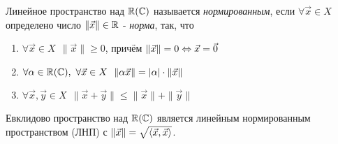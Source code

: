 \begin{definition}
	Линейное пространство над $\mathbb{R}(\mathbb{C})$ называется \textit{нормированным}, если $\forall \vec{x} \in X$ определено число $\|\vec{x}\| \in \mathbb{R}$ - \textit{норма}, так, что
	\begin{enumerate}
		\item $\forall \vec{x} \in X\ \ \|\vec{x}\| \ge 0$, причём $\|\vec{x}\| = 0 \Leftrightarrow \vec{x} = \vec{0}$
		
		\item $\forall \alpha \in \mathbb{R}(\mathbb{C}),\ \forall \vec{x} \in X\ \ \|\alpha \vec{x}\| = |\alpha| \cdot \|\vec{x}\|$
		
		\item $\forall \vec{x}, \vec{y} \in X\ \ \|\vec{x} + \vec{y}\| \le \|\vec{x}\| + \|\vec{y}\|$
	\end{enumerate}
\end{definition}

\begin{theorem} 
	Евклидово пространство над $\mathbb{R}(\mathbb{C})$ является линейным нормированным пространством (ЛНП) с $\|\vec{x}\| = \sqrt{\left\langle\vec{x}, \vec{x}\right\rangle}$.
\end{theorem}

